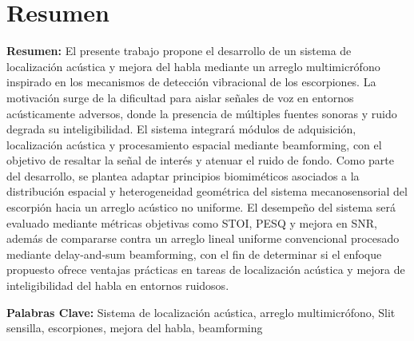 \chapter{Resumen}


\textbf{Resumen:}
El presente trabajo propone el desarrollo de un sistema de localización acústica y mejora del habla mediante un arreglo multimicrófono inspirado en los mecanismos de detección vibracional de los escorpiones. La motivación surge de la dificultad para aislar señales de voz en entornos acústicamente adversos, donde la presencia de múltiples fuentes sonoras y ruido degrada su inteligibilidad. El sistema integrará módulos de adquisición, localización acústica y procesamiento espacial mediante beamforming, con el objetivo de resaltar la señal de interés y atenuar el ruido de fondo. Como parte del desarrollo, se plantea adaptar principios biomiméticos asociados a la distribución espacial y heterogeneidad geométrica del sistema mecanosensorial del escorpión hacia un arreglo acústico no uniforme. El desempeño del sistema será evaluado mediante métricas objetivas como STOI, PESQ y mejora en SNR, además de compararse contra un arreglo lineal uniforme convencional procesado mediante delay-and-sum beamforming, con el fin de determinar si el enfoque propuesto ofrece ventajas prácticas en tareas de localización acústica y mejora de inteligibilidad del habla en entornos ruidosos.



\textbf{Palabras Clave:} Sistema de localización acústica, arreglo multimicrófono, Slit sensilla, escorpiones, mejora del habla, beamforming \\




\endinput 